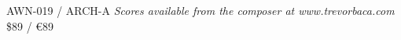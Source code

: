 \documentclass[11pt]{report}
\begin{document}
\null \vfill

AWN-019 / ARCH-A \hfill
\textit{Scores available from the composer at www.trevorbaca.com}
\hfill \$89 / \euro 89
\end{document}
